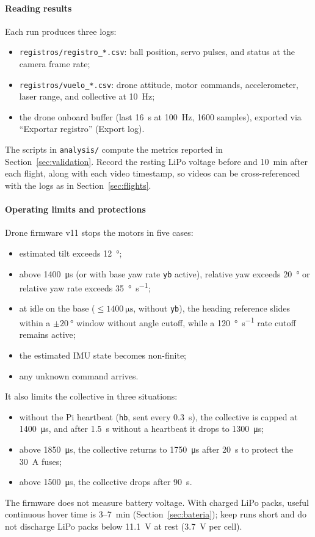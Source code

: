 \paragraph{Reading results}
Each run produces three logs:
\begin{itemize}
  \item \texttt{registros/registro\_*.csv}: ball position, servo pulses, and status at the camera frame rate;
  \item \texttt{registros/vuelo\_*.csv}: drone attitude, motor commands, accelerometer, laser range, and collective at \SI{10}{\hertz};
  \item the drone onboard buffer (last \SI{16}{\second} at \SI{100}{\hertz}, 1600 samples), exported via ``Exportar registro'' (Export log).
\end{itemize}
The scripts in \texttt{analysis/} compute the metrics reported in Section~\ref{sec:validation}. Record the resting LiPo voltage before and \SI{10}{\minute} after each flight, along with each video timestamp, so videos can be cross-referenced with the logs as in Section~\ref{sec:flights}.

\paragraph{Operating limits and protections}
Drone firmware v11 stops the motors in five cases:
\begin{itemize}
  \item estimated tilt exceeds \SI{12}{\degree};
  \item above \SI{1400}{\micro\second} (or with base yaw rate \texttt{yb} active), relative yaw exceeds \SI{20}{\degree} or relative yaw rate exceeds \SI{35}{\degree\per\second};
  \item at idle on the base ($\le\SI{1400}{\micro\second}$, without \texttt{yb}), the heading reference slides within a $\pm\SI{20}{\degree}$ window without angle cutoff, while a \SI{120}{\degree\per\second} rate cutoff remains active;
  \item the estimated IMU state becomes non-finite;
  \item any unknown command arrives.
\end{itemize}
It also limits the collective in three situations:
\begin{itemize}
  \item without the Pi heartbeat (\texttt{hb}, sent every \SI{0.3}{\second}), the collective is capped at \SI{1400}{\micro\second}, and after \SI{1.5}{\second} without a heartbeat it drops to \SI{1300}{\micro\second};
  \item above \SI{1850}{\micro\second}, the collective returns to \SI{1750}{\micro\second} after \SI{20}{\second} to protect the \SI{30}{\ampere} fuses;
  \item above \SI{1500}{\micro\second}, the collective drops after \SI{90}{\second}.
\end{itemize}
The firmware does not measure battery voltage. With charged LiPo packs, useful continuous hover time is 3--\SI{7}{\minute} (Section~\ref{sec:bateria}); keep runs short and do not discharge LiPo packs below \SI{11.1}{\volt} at rest (\SI{3.7}{\volt} per cell).

